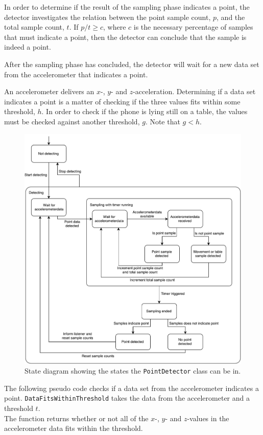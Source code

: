In order to determine if the result of the sampling phase indicates a point, 
the detector investigates the relation between the point sample count, $p$, 
and the total sample count, $t$. 
If $p/t \geq c$, where $c$ is the necessary percentage of samples that must indicate a point, 
then the detector can conclude that the sample is indeed a point.

After the sampling phase has concluded, 
the detector will wait for a new data set from the accelerometer that indicates a point.

An accelerometer delivers an $x$-, $y$- and $z$-acceleration. 
Determining if a data set indicates a point is a matter of checking if the three values fits within some threshold, $h$. 
In order to check if the phone is lying still on a table, 
the values must be checked against another threshold, $g$. Note that $g < h$.

\begin{figure}
\centering
\includegraphics[width=\textwidth]{images/point-detector-state-diagram}
\caption{State diagram showing the states the \texttt{PointDetector} class can be in.}
\label{fig:pointdetector-state-diagram}
\end{figure}

The following pseudo code checks if a data set from the accelerometer indicates a point. 
\texttt{DataFitsWithinThreshold} takes the data from the accelerometer and a threshold $t$. \\
The function returns whether or not all of the $x$-, $y$- and $z$-values in the accelerometer data fits within the threshold.

